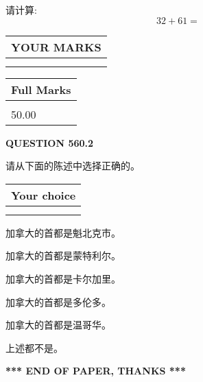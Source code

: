 \documentclass{ctexart}
\begin{document}
  
 
请计算:
\begin{equation}
32 +  %
61 = \nonumber
\end{equation}
 

 

 
  
\vspace{0.2in}
  
\noindent\begin{tabular}{|l|}
\hline
 YOUR MARKS  \\
\hline
 \\ 
 \\ 
\hline
\end{tabular}
\hspace{0.05in} \begin{tabular}{|l|}
\hline
 Full Marks  \\
\hline
 \\ 
50.00 \\
\hline
\end{tabular}
{\textbf{\Large{QUESTION
560.2 
}}}
  
  
请从下面的陈述中选择正确的。
  
  
\noindent\hspace{3.0in} \begin{tabular}{|l|}
\hline
Your choice \\
\hline
 \\ 
 \\ 
\hline
\end{tabular}
  
  
 
 
加拿大的首都是魁北克市。
 
 
加拿大的首都是蒙特利尔。
 
 
加拿大的首都是卡尔加里。
 
 
加拿大的首都是多伦多。
 
 
加拿大的首都是温哥华。
 
 
 上述都不是。
 
 
   
   
 \vspace{0.2in}
 
   
   
   
   
\vspace{1.0in} 
{\textbf{\large{ *** END OF PAPER, THANKS *** }}} 
   
\end{document}
